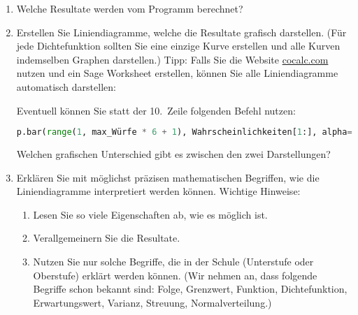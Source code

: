 \documentclass{article}
\begin{document}
\begin{enumerate}
\item Welche Resultate werden vom Programm berechnet?
\item Erstellen Sie Liniendiagramme, welche die Resultate grafisch darstellen. (Für jede
Dichtefunktion sollten Sie eine einzige Kurve erstellen und alle Kurven indemselben Graphen
dar\-stellen.) Tipp: Falls Sie die Website \url{cocalc.com} nutzen und ein Sage Worksheet
erstellen, können Sie alle Liniendiagramme automatisch darstellen:

Eventuell können Sie statt der 10.~Zeile folgenden Befehl nutzen:
\begin{lstlisting}[language=Python,firstnumber=10]
    p.bar(range(1, max_Würfe * 6 + 1), Wahrscheinlichkeiten[1:], alpha=0.5)
\end{lstlisting}
Welchen grafischen Unterschied gibt es zwischen den zwei Darstellungen?
\item Erklären Sie mit möglichst präzisen mathematischen Begriffen, wie die Liniendiagramme interpretiert werden können.
Wichtige Hinweise:
\begin{enumerate}
\item Lesen Sie so viele Eigenschaften ab, wie es möglich ist.
\item Verallgemeinern Sie die Resultate.
\item Nutzen Sie nur solche Begriffe, die in der Schule (Unterstufe oder Oberstufe) erklärt werden können.
(Wir nehmen an, dass folgende Begriffe schon bekannt sind: Folge, Grenz\-wert, Funktion,
Dichtefunktion, Erwartungswert, Varianz, Streuung, Normalverteilung.)
\end{enumerate}

\end{enumerate}
\end{document}
